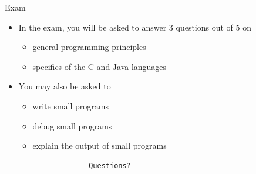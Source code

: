 \documentclass{beamer}
\begin{document}
\begin{frame}

Exam

\begin{itemize}
\item In the exam, you will be asked to answer 3 questions out of 5 on

\begin{itemize}
\item general programming principles
\item specifics of the C and Java languages
\end{itemize}
\item You may also be asked to 

\begin{itemize}
\item write small programs
\item debug small programs
\item explain the output of small programs
\end{itemize}
\end{itemize}
\end{frame} 

\begin{frame}[fragile]

\begin{lstlisting}
                    Questions? 
\end{lstlisting}
\end{frame} 
\end{document}
